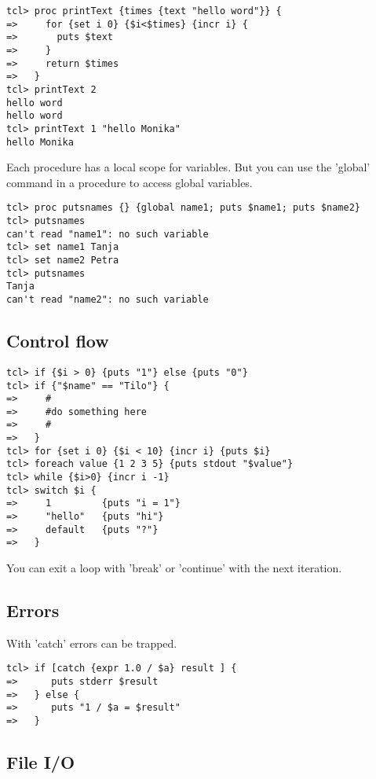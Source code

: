 \begin{verbatim}
tcl> proc printText {times {text "hello word"}} {
=>     for {set i 0} {$i<$times} {incr i} {
=>       puts $text
=>     }
=>     return $times
=>   }
tcl> printText 2
hello word
hello word
tcl> printText 1 "hello Monika"
hello Monika
\end{verbatim}

Each procedure has a local scope for variables. But you can use the
'global' command in a procedure to access global variables.

\begin{verbatim}
tcl> proc putsnames {} {global name1; puts $name1; puts $name2}
tcl> putsnames
can't read "name1": no such variable
tcl> set name1 Tanja
tcl> set name2 Petra
tcl> putsnames
Tanja
can't read "name2": no such variable
\end{verbatim}

\subsection*{Control flow}

\begin{verbatim}
tcl> if {$i > 0} {puts "1"} else {puts "0"}
tcl> if {"$name" == "Tilo"} {
=>     #
=>     #do something here
=>     #
=>   }
tcl> for {set i 0} {$i < 10} {incr i} {puts $i}
tcl> foreach value {1 2 3 5} {puts stdout "$value"}
tcl> while {$i>0} {incr i -1}
tcl> switch $i {
=>     1         {puts "i = 1"}
=>     "hello"   {puts "hi"}
=>     default   {puts "?"}
=>   }
\end{verbatim}


You can exit a loop with 'break' or 'continue' with the next iteration.

\subsection*{Errors}

With 'catch' errors can be trapped.

\begin{verbatim}
tcl> if [catch {expr 1.0 / $a} result ] {
=>      puts stderr $result
=>   } else {
=>      puts "1 / $a = $result"
=>   }       
\end{verbatim}

\subsection*{File I/O}

